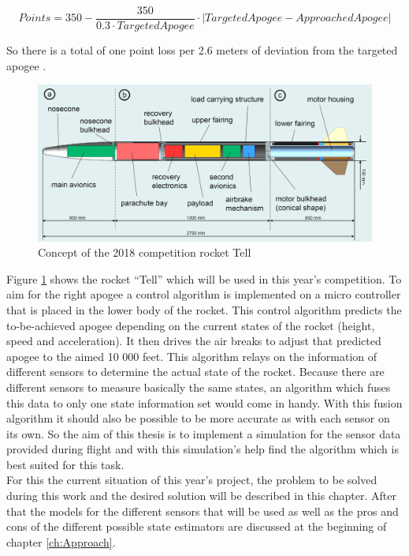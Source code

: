  $$ Points =  350 - \frac{350}{0.3\cdot TargetedApogee} \cdot |TargetedApogee - ApproachedApogee|$$

 So there is a total of one point loss per 2.6 meters of deviation from the targeted apogee \cite{SpaceportAmericaCup2018}. \\

 \begin{figure}[h]
 \centering
 \includegraphics[width=.8\textwidth]{./Pictures/RocketModel.jpg}
 \caption{Concept of the 2018 competition rocket Tell}
 \label{fig:2018RocketModel}
\end{figure}
 Figure \ref{fig:2018RocketModel} shows the rocket ``Tell'' which will be used in this year's competition.
 To aim for the right apogee a control algorithm is implemented on a micro controller that is placed in the lower body of the rocket.
 This control algorithm predicts the to-be-achieved apogee depending on the current states of the rocket (height, speed and acceleration).
 It then drives the air breaks to adjust that predicted apogee to the aimed 10 000 feet.
 This algorithm relays on the information of different sensors to determine the actual state of the rocket.
 Because there are different sensors to measure basically the same states, an algorithm which fuses this data to only one state information set would come in handy.
 With this fusion algorithm it should also be possible to be more accurate as with each sensor on its own.
 So the aim of this thesis is to implement a simulation for the sensor data provided during flight and with this simulation's help find the algorithm which is best suited for this task.\\
 For this the current situation of this year's project, the problem to be solved during this work and the desired solution will be described in this chapter.
 After that the models for the different sensors that will be used as well as the pros and cons of the different possible state estimators are discussed at the beginning of chapter \ref{ch:Approach}.
